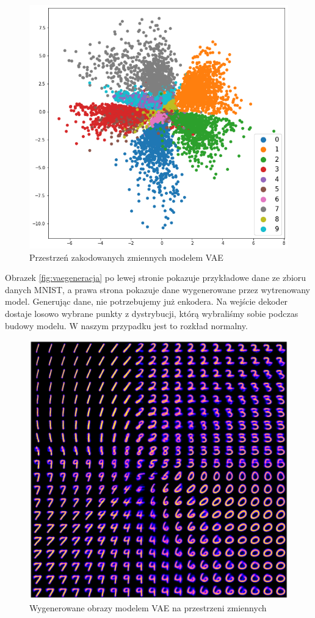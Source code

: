 \documentclass[a4paper,12pt,oneside]{book} %
\begin{document}
\begin{figure}[h!]
	\centering
	\includegraphics[width=14cm]{vaelatentspace.png}
	\caption{Przestrzeń zakodowanych zmiennych modelem VAE}
	\label{fig:vaelatent}
\end{figure}
Obrazek \ref{fig:vaegeneracja} po lewej stronie pokazuje przykładowe dane ze zbioru danych MNIST, a prawa strona pokazuje dane wygenerowane przez wytrenowany model. Generując dane, nie potrzebujemy już enkodera. Na wejście dekoder dostaje losowo wybrane punkty z dystrybucji, którą wybraliśmy sobie podczas budowy modelu. W naszym przypadku jest to rozkład normalny.
\newpage
\begin{figure}[h!]
	\centering
	\includegraphics[width=14cm]{vaelatentgen.png}
	\caption{Wygenerowane obrazy modelem VAE na przestrzeni zmiennych}
	\label{fig:vaelatentgen}
\end{figure}
\end{document}
